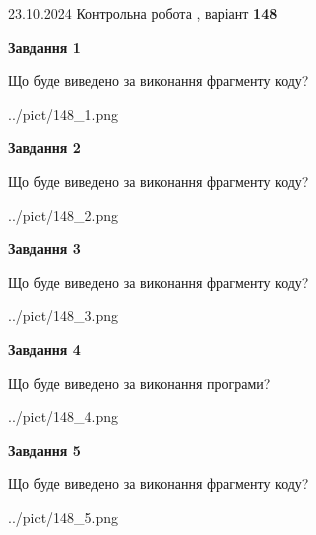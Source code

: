 \documentclass[12pt, ukrainian]{article}
\begin{document}
{\Large{23.10.2024 Контрольна робота , варіант  \No \textbf { 148 }\par}}
{
\begin {large}
{\begin {center}\textbf{Завдання 1}\end {center}}

Що буде виведено за виконання фрагменту коду?\par
\begin{center}
	{../pict/148_1.png}
\end{center}
\newpage

{\begin {center}\textbf{Завдання 2}\end {center}}

Що буде виведено за виконання фрагменту коду?\par
\begin{center}
	{../pict/148_2.png}
\end{center}
\newpage

{\begin {center}\textbf{Завдання 3}\end {center}}

Що буде виведено за виконання фрагменту коду?\par
\begin{center}
	{../pict/148_3.png}
\end{center}
\newpage

{\begin {center}\textbf{Завдання 4}\end {center}}

Що буде виведено за виконання програми?\par
\begin{center}
	{../pict/148_4.png}
\end{center}
\newpage

{\begin {center}\textbf{Завдання 5}\end {center}}

Що буде виведено за виконання фрагменту коду?\par
\begin{center}
	{../pict/148_5.png}
\end{center}
\newpage


\end{large}}
\end{document}
